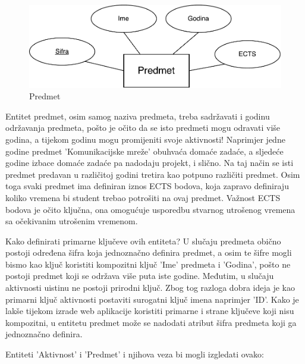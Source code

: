 \documentclass[times, utf8, zavrsni]{fer}
\begin{document}
\begin{figure}[H]
\centering
\includegraphics[width=\textwidth,height=\textheight,keepaspectratio]{img/predmet.pdf}
\caption{Predmet}
\label{fig:predmet}
\end{figure}

Entitet predmet, osim samog naziva predmeta, treba sadržavati i godinu održavanja predmeta, pošto je očito da se isto predmeti mogu odravati više godina, a tijekom godinu mogu promijeniti svoje aktivnosti! Naprimjer jedne godine predmet 'Komunikacijske mreže' obuhvaća domaće zadaće, a sljedeće godine izbace domaće zadaće pa nadodaju projekt, i slično. Na taj način se isti predmet predavan u različitoj godini tretira kao potpuno različiti predmet. Osim toga svaki predmet ima definiran iznos ECTS bodova, koja zapravo definiraju koliko vremena bi student trebao potrošiti na ovaj predmet. Važnost ECTS bodova je očito ključna, ona omogućuje usporedbu stvarnog utrošenog vremena sa očekivanim utrošenim vremenom.

Kako definirati primarne ključeve ovih entiteta? U slučaju predmeta obično postoji određena šifra koja jednoznačno definira predmet, a osim te šifre mogli bismo kao ključ koristiti kompozitni ključ 'Ime' predmeta i 'Godina', pošto ne postoji predmet koji se održava više puta iste godine. Međutim, u slučaju aktivnosti uistinu ne postoji prirodni ključ. Zbog tog razloga dobra ideja je kao primarni ključ aktivnosti postaviti surogatni ključ imena naprimjer 'ID'. Kako je lakše tijekom izrade web aplikacije koristiti primarne i strane ključeve koji nisu kompozitni, u entitetu predmet može se nadodati atribut šifra predmeta koji ga jednoznačno definira.

Entiteti 'Aktivnost' i 'Predmet' i njihova veza bi mogli izgledati ovako:
\end{document}
